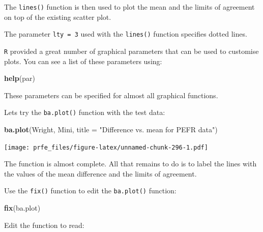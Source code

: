 \documentclass[12pt,]{book}
\newenvironment{Shaded}{\begin{snugshade}}{\end{snugshade}}
\newcommand{\KeywordTok}[1]{\textcolor[rgb]{0.13,0.29,0.53}{\textbf{#1}}}
\newcommand{\DataTypeTok}[1]{\textcolor[rgb]{0.13,0.29,0.53}{#1}}
\newcommand{\StringTok}[1]{\textcolor[rgb]{0.31,0.60,0.02}{#1}}
\newcommand{\NormalTok}[1]{#1}
\theoremstyle{definition}
\theoremstyle{definition}
\theoremstyle{definition}
\theoremstyle{remark}
\begin{document}
The \texttt{lines()} function is then used to plot the mean and the
limits of agreement on top of the existing scatter plot.

The parameter \texttt{lty\ =\ 3} used with the \texttt{lines()} function
specifies dotted lines.

\texttt{R} provided a great number of graphical parameters that can be
used to customise plots. You can see a list of these parameters using:

\begin{Shaded}
\begin{Highlighting}[]
\KeywordTok{help}\NormalTok{(par)}
\end{Highlighting}
\end{Shaded}

These parameters can be specified for almost all graphical functions.

Lets try the \texttt{ba.plot()} function with the test data:

\begin{Shaded}
\begin{Highlighting}[]
\KeywordTok{ba.plot}\NormalTok{(Wright, Mini, }\DataTypeTok{title =}  \StringTok{"Difference vs. mean for PEFR data"}\NormalTok{)}
\end{Highlighting}
\end{Shaded}

\texttt{[image: prfe\_files/figure-latex/unnamed-chunk-296-1.pdf]}

The function is almost complete. All that remains to do is to label the
lines with the values of the mean difference and the limits of
agreement.

Use the \texttt{fix()} function to edit the \texttt{ba.plot()} function:

\begin{Shaded}
\begin{Highlighting}[]
\KeywordTok{fix}\NormalTok{(ba.plot)}
\end{Highlighting}
\end{Shaded}

Edit the function to read:
\end{document}
